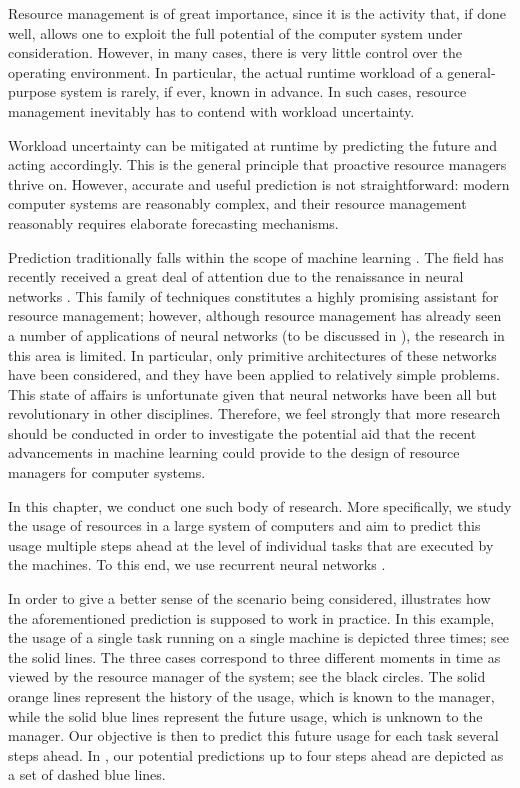 Resource management is of great importance, since it is the activity that, if
done well, allows one to exploit the full potential of the computer system under
consideration. However, in many cases, there is very little control over the
operating environment. In particular, the actual runtime workload of a
general-purpose system is rarely, if ever, known in advance. In such cases,
resource management inevitably has to contend with workload uncertainty.

Workload uncertainty can be mitigated at runtime by predicting the future and
acting accordingly. This is the general principle that proactive resource
managers thrive on. However, accurate and useful prediction is not
straightforward: modern computer systems are reasonably complex, and their
resource management reasonably requires elaborate forecasting mechanisms.

Prediction traditionally falls within the scope of machine learning
\cite{hastie2013}. The field has recently received a great deal of attention due
to the renaissance in neural networks \cite{goodfellow2016}. This family of
techniques constitutes a highly promising assistant for resource management;
however, although resource management has already seen a number of applications
of neural networks (to be discussed in ), the research in this
area is limited. In particular, only primitive architectures of these networks
have been considered, and they have been applied to relatively simple problems.
This state of affairs is unfortunate given that neural networks have been all
but revolutionary in other disciplines. Therefore, we feel strongly that more
research should be conducted in order to investigate the potential aid that the
recent advancements in machine learning could provide to the design of resource
managers for computer systems.

In this chapter, we conduct one such body of research. More specifically, we
study the usage of resources in a large system of computers and aim to predict
this usage multiple steps ahead at the level of individual tasks that are
executed by the machines. To this end, we use recurrent neural networks
\cite{goodfellow2016}.

In order to give a better sense of the scenario being considered,
 illustrates how the aforementioned prediction is
supposed to work in practice. In this example, the  usage of a single
task running on a single machine is depicted three times; see the solid lines.
The three cases correspond to three different moments in time as viewed by the
resource manager of the system; see the black circles. The solid orange lines
represent the history of the usage, which is known to the manager, while the
solid blue lines represent the future usage, which is unknown to the manager.
Our objective is then to predict this future usage for each task several steps
ahead. In , our potential predictions up to four steps
ahead are depicted as a set of dashed blue lines.

